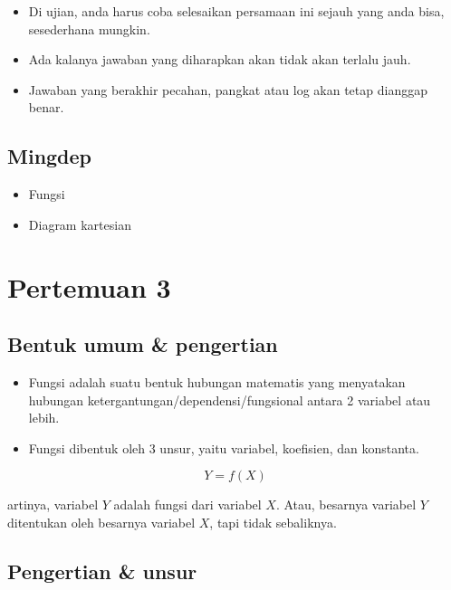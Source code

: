 \documentclass[
  letterpaper,
  DIV=11,
  numbers=noendperiod]{scrartcl}
\begin{document}
\begin{itemize}
\item
  Di ujian, anda harus coba selesaikan persamaan ini sejauh yang anda
  bisa, sesederhana mungkin.
\item
  Ada kalanya jawaban yang diharapkan akan tidak akan terlalu jauh.
\item
  Jawaban yang berakhir pecahan, pangkat atau log akan tetap dianggap
  benar.
\end{itemize}

\subsection{Mingdep}\label{mingdep-1}

\begin{itemize}
\item
  Fungsi
\item
  Diagram kartesian
\end{itemize}

\section{Pertemuan 3}\label{pertemuan-3}

\subsection{Bentuk umum \& pengertian}\label{bentuk-umum-pengertian}

\begin{itemize}
\item
  Fungsi adalah suatu bentuk hubungan matematis yang menyatakan hubungan
  ketergantungan/dependensi/fungsional antara 2 variabel atau lebih.
\item
  Fungsi dibentuk oleh 3 unsur, yaitu variabel, koefisien, dan
  konstanta.
\end{itemize}

\[
Y=f(X)
\]

artinya, variabel \(Y\) adalah fungsi dari variabel \(X\). Atau,
besarnya variabel \(Y\) ditentukan oleh besarnya variabel \(X\), tapi
tidak sebaliknya.

\subsection{Pengertian \& unsur}\label{pengertian-unsur}
\end{document}
